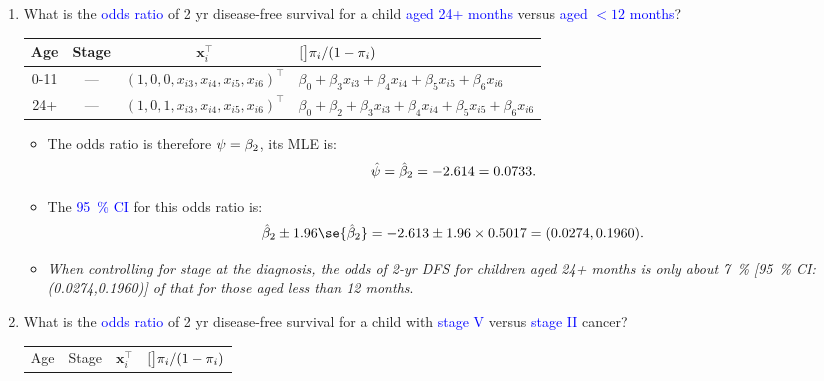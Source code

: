 \documentclass[oneside]{book}\usepackage[]{graphicx}\usepackage[svgnames]{xcolor}
\let\exp\relax%
\let\log\relax%
\providecommand{\Vector}[1]{\bm{#1}}%
\begin{document}
\begin{enumerate}[label={Q\arabic*:}]
    \item What is the \textcolor{Blue}{odds ratio} of 2 yr disease-free survival for a child \textcolor{Blue}{aged 24+ months}
          versus \textcolor{Blue}{aged $<12$ months}?
          \begin{table}[!htbp]
              \centering
              \begin{tabular}{cccl}
                  Age  & Stage & $ \Vector{x}_i^\top $                        & $ \log[\big]{\pi_i/(1-\pi_i)} $                                            \\
                  \midrule
                  0-11 & ---   & $ (1,0,0,x_{i3},x_{i4},x_{i5},x_{i6})^\top $ & $ \beta_0+\beta_3x_{i3}+\beta_4x_{i4}+\beta_5x_{i5}+\beta_6x_{i6} $        \\
                  24+  & ---   & $ (1,0,1,x_{i3},x_{i4},x_{i5},x_{i6})^\top $ & $ \beta_0+\beta_2+\beta_3x_{i3}+\beta_4x_{i4}+\beta_5x_{i5}+\beta_6x_{i6}$ \\
                  \bottomrule
              \end{tabular}
          \end{table}
          \begin{itemize}
              \item The odds ratio is therefore $ \psi=\exp{\beta_2} $, its MLE is:
                    \[ \hat{\psi}=\exp{\hat{\beta}_2}=\exp{-2.614}=0.0733. \]
              \item The \textcolor{Blue}{\qty{95}{\percent} CI} for this odds ratio is:
                    \[ \exp{\hat{\beta}_2\pm 1.96\se{\hat{\beta}_2}}=\exp{-2.613\pm 1.96\times 0.5017}=(0.0274,0.1960). \]
              \item \emph{When controlling for stage at the diagnosis, the odds of 2-yr DFS for children aged 24+ months
                        is only about \qty{7}{\percent} [\qty{95}{\percent} CI\@: (0.0274,0.1960)] of that for those aged less than 12 months}.
          \end{itemize}
    \item What is the \textcolor{Blue}{odds ratio} of 2 yr disease-free survival for a child with
          \textcolor{Blue}{stage V} versus \textcolor{Blue}{stage II} cancer?
          \begin{table}[!htbp]
              \centering
              \begin{tabular}{cccl}
                  Age & Stage & $ \Vector{x}_i^\top $              & $ \log[\big]{\pi_i/(1-\pi_i)} $                 \\

\end{tabular}
\end{table}
\end{enumerate}
\end{document}
